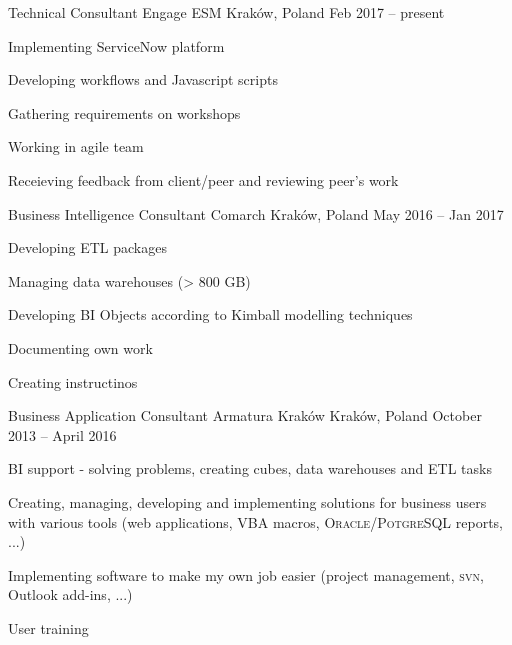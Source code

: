 \begin{cventries}
  \cventry
    {Technical Consultant}
    {Engage ESM}
    {Kraków, Poland}
    {Feb 2017 -- present}
    {
      \begin{cvitems}
        \item {Implementing ServiceNow platform}
        \item {Developing workflows and Javascript scripts}
        \item {Gathering requirements on workshops}
        \item {Working in agile team}
        \item {Receieving feedback from client/peer and reviewing peer's work}
      \end{cvitems}
    }
  \cventry
    {Business Intelligence Consultant}
    {Comarch}
    {Kraków, Poland}
    {May 2016 -- Jan 2017}
    {
      \begin{cvitems}
        \item {Developing ETL packages}
        \item {Managing data warehouses (> 800 GB)}
        \item {Developing BI Objects according to Kimball modelling techniques}
        \item {Documenting own work}
        \item {Creating instructinos}
      \end{cvitems}
    }
  \cventry
    {Business Application Consultant}
    {Armatura Kraków}
    {Kraków, Poland}
    {October 2013 -- April 2016}
    {
      \begin{cvitems}
        \item {BI support - solving problems, creating cubes, data warehouses and \textsc{ETL} tasks}
        \item {Creating, managing, developing and implementing solutions for business users with various tools (web applications, \textsc{VBA} macros, \textsc{Oracle}/\textsc{PotgreSQL} reports, ...)}
        \item {Implementing software to make my own job easier (project management, \textsc{svn}, Outlook add-ins, ...)}
        \item {User training}

\end{cvitems}}
\end{cventries}
